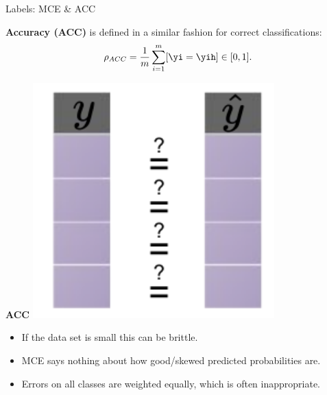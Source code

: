 \documentclass[11pt,compress,t,notes=noshow, xcolor=table]{beamer}
\begin{document}
\begin{vbframe}{Labels: MCE \& ACC}
\begin{minipage}[t]{0.75\textwidth} 
  \small
  \textbf{Accuracy (ACC)} is defined in a similar fashion for correct 
  classifications:
  $$ \rho_{ACC} = \frac{1}{m} \sum_{i = 1}^m [\yi = \yih] \in [0, 1]. $$
\end{minipage}%
\begin{minipage}[t]{0.25\textwidth}
  \centering
  \begin{center}
    \textbf{ACC}
    \includegraphics[width=0.7\textwidth]
    {figure_man/eval-classif-loss-compare.pdf}
  \end{center}
\end{minipage}

\lz

\begin{itemize}
  \small
  \item If the data set is small this can be brittle.
  \item MCE says nothing about how good/skewed predicted probabilities are.
  \item Errors on all classes are weighted equally, which is often 
  inappropriate.
\end{itemize}

\end{vbframe}

\end{document}
